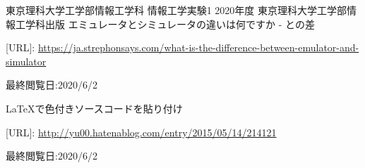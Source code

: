 \documentclass[12pt]{jarticle}
\begin{document}
\begin{thebibliography}{99}
	\label{sannkoubunnkenn_chapter}
	東京理科大学工学部情報工学科 情報工学実験1 2020年度
	東京理科大学工学部情報工学科出版
	エミュレータとシミュレータの違いは何ですか - との差

	[URL]: \url{https://ja.strephonsays.com/what-is-the-difference-between-emulator-and-simulator}

	最終閲覧日:2020/6/2

	\bibitem[3]{}LaTeXで色付きソースコードを貼り付け

	[URL]: \url{http://yu00.hatenablog.com/entry/2015/05/14/214121}

	最終閲覧日:2020/6/2


\end{thebibliography}

\clearpage
\appendix
\end{document}
